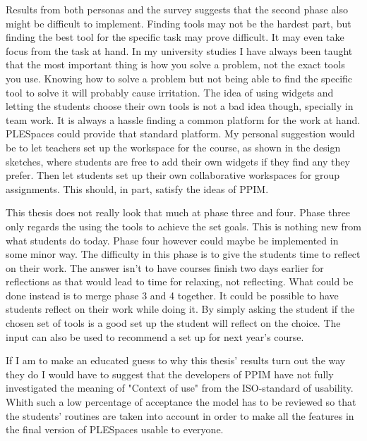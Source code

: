 Results from both personas and the survey suggests that the second phase also might be difficult to implement. Finding tools may not be the hardest part, but finding the best tool for the specific task may prove difficult. It may even take focus from the task at hand. In my university studies I have always been taught that the most important thing is how you solve a problem, not the exact tools you use. Knowing how to solve a problem but not being able to find the specific tool to solve it will probably cause irritation. The idea of using widgets and letting the students choose their own tools is not a bad idea though, specially in team work. It is always a hassle finding a common platform for the work at hand. PLESpaces could provide that standard platform. My personal suggestion would be to let teachers set up the workspace for the course, as shown in the design sketches, where students are free to add their own widgets if they find any they prefer. Then let students set up their own collaborative workspaces for group assignments. This should, in part, satisfy the ideas of PPIM.

This thesis does not really look that much at phase three and four. Phase three only regards the using the tools to achieve the set goals. This is nothing new from what students do today. Phase four however could maybe be implemented in some minor way. The difficulty in this phase is to give the students time to reflect on their work. The answer isn't to have courses finish two days earlier for reflections as that would lead to time for relaxing, not reflecting. What could be done instead is to merge phase 3 and 4 together. It could be possible to have students reflect on their work while doing it. By simply asking the student if the chosen set of tools is a good set up the student will reflect on the choice. The input can also be used to recommend a set up for next year's course.

If I am to make an educated guess to why this thesis' results turn out the way they do I would have to suggest that the developers of PPIM have not fully investigated the meaning of "Context of use" from the ISO-standard of usability. Whith such a low percentage of acceptance the model has to be reviewed so that the students' routines are taken into account in order to make all the features in the final version of PLESpaces usable to everyone.
